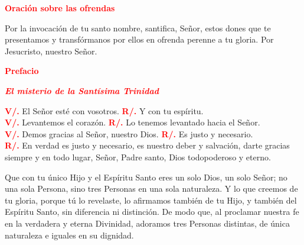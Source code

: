 \documentclass[12pt, letterpaper, spanish]{report}
\begin{document}
\huge {\bfseries \textcolor{red}{Oraci\'on sobre las ofrendas}} \newline

\Large Por la invocaci\'on de tu santo nombre, santifica, Se\~nor, 
estos dones que te presentamos y transf\'ormanos por ellos
en ofrenda perenne a tu gloria. Por Jesucristo, nuestro Se\~nor. \newline

\huge {\bfseries \textcolor{red}{Prefacio}} \newline

\begin{center}
\large {\bfseries \textcolor{red}{\textit{El misterio de la Sant\'isima Trinidad}}}
\end{center}
\Large \textcolor{red}{\bfseries V/.} \hspace{0.5cm} El Se\~nor est\'e con vosotros. \newline
\Large \textcolor{red}{\bfseries R/.} \hspace{0.5cm} Y con tu esp\'iritu. \newline \\
\Large \textcolor{red}{\bfseries V/.} \hspace{0.5cm} Levantemos el coraz\'on. \newline
\Large \textcolor{red}{\bfseries R/.} \hspace{0.5cm} Lo tenemos levantado hacia el Se\~nor. \newline \\
\Large \textcolor{red}{\bfseries V/.} \hspace{0.5cm} Demos gracias al Se\~nor, nuestro Dios. \newline
\Large \textcolor{red}{\bfseries R/.} \hspace{0.5cm} Es justo y necesario. \newline \\
\Large \textcolor{red}{\bfseries R/.} \hspace{0.5cm} En verdad es justo y necesario,
es nuestro deber y salvaci\'on, darte gracias siempre y en todo lugar,
Se\~nor, Padre santo, Dios todopoderoso y eterno. \newline

\hspace{1.5cm} Que con tu \'unico Hijo y el Esp\'iritu Santo eres un solo Dios, un solo Se\~nor;
no una sola Persona, sino tres Personas en una sola naturaleza.
Y lo que creemos de tu gloria, porque t\'u lo revelaste, lo afirmamos tambi\'en de tu Hijo,
y tambi\'en del Espíritu Santo, sin diferencia ni distinci\'on.
De modo que, al proclamar nuestra fe en la verdadera y eterna Divinidad,
adoramos tres Personas distintas, de \'unica naturaleza e iguales en su dignidad. \newline
\end{document}
